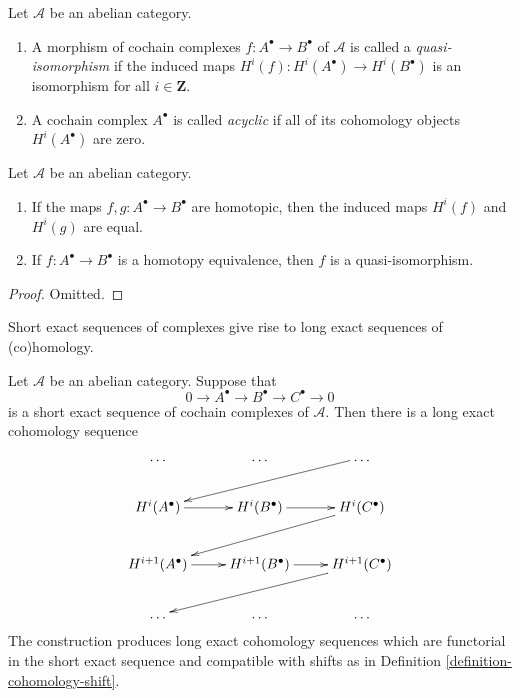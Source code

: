 \begin{definition}
\label{definition-quasi-isomorphism-cochain}
Let $\mathcal{A}$ be an abelian category.
\begin{enumerate}
\item A morphism of cochain complexes $f :
A^\bullet \to B^\bullet$
of $\mathcal{A}$ is called a {\it
quasi-isomorphism} if the induced
maps $H^i(f) : H^i(A^\bullet) \to
H^i(B^\bullet)$
is an isomorphism for all $i \in \mathbf{Z}$.
\item A cochain complex $A^\bullet$ is called
{\it acyclic} if all of its cohomology
objects
$H^i(A^\bullet)$ are zero.
\end{enumerate}
\end{definition}

\begin{lemma}
\label{lemma-map-cohomology-homotopy-cochain}
Let $\mathcal{A}$ be an abelian category.
\begin{enumerate}
\item If the maps $f, g : A^\bullet \to
B^\bullet$ are
homotopic, then the induced maps $H^i(f)$ and
$H^i(g)$
are equal.
\item If $f : A^\bullet \to B^\bullet$ is a
homotopy equivalence,
then $f$ is a quasi-isomorphism.
\end{enumerate}
\end{lemma}

\begin{proof}
Omitted.
\end{proof}

\begin{lemma}
\label{lemma-long-exact-sequence-cochain}
\begin{slogan}
Short exact sequences of complexes give rise
to long exact sequences
of (co)homology.
\end{slogan}
Let $\mathcal{A}$ be an abelian category.
Suppose that
$$
0 \to
A^\bullet \to
B^\bullet \to
C^\bullet \to
0
$$
is a short exact sequence of cochain
complexes of $\mathcal{A}$.
Then there is a long exact cohomology
sequence
$$
\xymatrix{
\ldots & \ldots & \ldots \ar[lld] \\
H^i(A^\bullet) \ar[r] &
H^i(B^\bullet) \ar[r] &
H^i(C^\bullet) \ar[lld] \\
H^{i + 1}(A^\bullet) \ar[r] &
H^{i + 1}(B^\bullet) \ar[r] &
H^{i + 1}(C^\bullet) \ar[lld] \\
\ldots & \ldots & \ldots \\
}
$$
The construction produces long exact
cohomology sequences
which are functorial in the short exact
sequence and compatible with shifts as in
Definition \ref{definition-cohomology-shift}.
\end{lemma}

